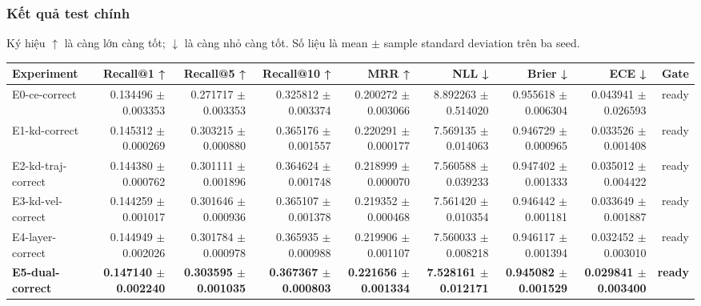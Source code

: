 \subsubsection*{Kết quả test chính}

Ký hiệu $\uparrow$ là càng lớn càng tốt; $\downarrow$ là càng nhỏ càng tốt. Số liệu là mean $\pm$ sample standard deviation trên ba seed.

\begin{table}[!htbp]
\centering
\scriptsize
\setlength{\tabcolsep}{2.5pt}
\begin{adjustbox}{max width=\textwidth}
\begin{tabular}{@{}lrrrrrrrr@{}}
\toprule
Experiment & Recall@1 ↑ & Recall@5 ↑ & Recall@10 ↑ & MRR ↑ & NLL ↓ & Brier ↓ & ECE ↓ & Gate \\
\midrule
E0-ce-correct & 0.134496 $\pm$ 0.003353 & 0.271717 $\pm$ 0.003353 & 0.325812 $\pm$ 0.003374 & 0.200272 $\pm$ 0.003066 & 8.892263 $\pm$ 0.514020 & 0.955618 $\pm$ 0.006304 & 0.043941 $\pm$ 0.026593 & ready \\
E1-kd-correct & 0.145312 $\pm$ 0.000269 & 0.303215 $\pm$ 0.000880 & 0.365176 $\pm$ 0.001557 & 0.220291 $\pm$ 0.000177 & 7.569135 $\pm$ 0.014063 & 0.946729 $\pm$ 0.000965 & 0.033526 $\pm$ 0.001408 & ready \\
E2-kd-traj-correct & 0.144380 $\pm$ 0.000762 & 0.301111 $\pm$ 0.001896 & 0.364624 $\pm$ 0.001748 & 0.218999 $\pm$ 0.000070 & 7.560588 $\pm$ 0.039233 & 0.947402 $\pm$ 0.001333 & 0.035012 $\pm$ 0.004422 & ready \\
E3-kd-vel-correct & 0.144259 $\pm$ 0.001017 & 0.301646 $\pm$ 0.000936 & 0.365107 $\pm$ 0.001378 & 0.219352 $\pm$ 0.000468 & 7.561420 $\pm$ 0.010354 & 0.946442 $\pm$ 0.001181 & 0.033649 $\pm$ 0.001887 & ready \\
E4-layer-correct & 0.144949 $\pm$ 0.002026 & 0.301784 $\pm$ 0.000978 & 0.365935 $\pm$ 0.000988 & 0.219906 $\pm$ 0.001107 & 7.560033 $\pm$ 0.008218 & 0.946117 $\pm$ 0.001394 & 0.032452 $\pm$ 0.003010 & ready \\
\textbf{E5-dual-correct} & \textbf{0.147140 $\pm$ 0.002240} & \textbf{0.303595 $\pm$ 0.001035} & \textbf{0.367367 $\pm$ 0.000803} & \textbf{0.221656 $\pm$ 0.001334} & \textbf{7.528161 $\pm$ 0.012171} & \textbf{0.945082 $\pm$ 0.001529} & \textbf{0.029841 $\pm$ 0.003400} & \textbf{ready} \\
\bottomrule
\end{tabular}
\end{adjustbox}
\end{table}

